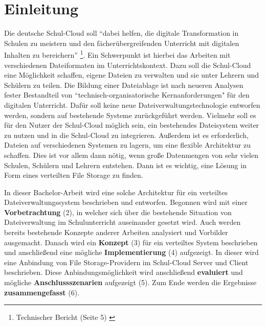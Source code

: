 \section{Einleitung}
\label{sec:intro}

Die deutsche Schul-Cloud soll ``dabei helfen, die digitale Transformation in Schulen zu meistern und den fächerübergreifenden Unterricht mit digitalen Inhalten zu bereichern'' \footnote{ Technischer Bericht (Seite 5) \cite{paper:technischerbericht}}. Ein Schwerpunkt ist hierbei das Arbeiten mit verschiedenen Dateiformaten im Unterrichtskontext. Dazu soll die Schul-Cloud eine Möglichkeit schaffen, eigene Dateien zu verwalten und sie unter Lehrern und Schülern zu teilen. Die Bildung einer Dateiablage ist nach neueren Analysen fester Bestandteil von ``technisch-organisatorische Kernanforderungen" \cite{paper:breiterstolpmannzeising2015} für den digitalen Unterricht. Dafür soll keine neue Dateiverwaltungstechnologie entworfen werden, sondern auf bestehende Systeme zurückgeführt werden. Vielmehr soll es für den Nutzer der Schul-Cloud möglich sein, ein bestehendes Dateisystem weiter zu nutzen und in die Schul-Cloud zu integrieren. Außerdem ist es erforderlich, Dateien auf verschiedenen Systemen zu lagern, um eine flexible Architektur zu schaffen. Dies ist vor allem dann nötig, wenn große Datenmengen von sehr vielen Schulen, Schülern und Lehrern entstehen. Dann ist es wichtig, eine Lösung in Form eines verteilten File Storage zu finden. 

In dieser Bachelor-Arbeit wird eine solche Architektur für ein verteiltes Dateiverwaltungssystem beschrieben und entworfen. Begonnen wird mit einer \textbf{Vorbetrachtung} (2), in welcher sich über die bestehende Situation von Dateiverwaltung im Schulunterricht auseinander gesetzt wird. Auch werden bereits bestehende Konzepte anderer Arbeiten analysiert und Vorbilder ausgemacht. Danach wird ein \textbf{Konzept} (3) für ein verteiltes System beschrieben und anschließend eine mögliche \textbf{Implementierung} (4)  aufgezeigt. In dieser wird eine Anbindung von File Storage-Providern im Schul-Cloud Server und Client beschrieben. Diese Anbindungsmöglichkeit wird anschließend \textbf{evaluiert} und mögliche \textbf{Anschlussszenarien} aufgezeigt (5). Zum Ende werden die Ergebnisse \textbf{zusammengefasst} (6).

\clearpage
